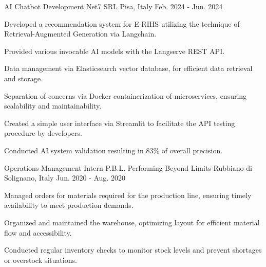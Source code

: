 

\begin{cventries}

  \cventry
  {AI Chatbot Development} %
  {Net7 SRL} %
  {Pisa, Italy} %
  {Feb. 2024 - Jun. 2024} %
  {
    \begin{cvitems} %
      \item {Developed a recommendation system for E-RIHS utilizing the technique of Retrieval-Augmented Generation via Langchain.}
      \item {Provided various invocable AI models with the Langserve REST API.}
      \item {Data management via Elasticsearch vector database, for efficient data retrieval and storage.}
      \item {Separation of concerns via Docker containerization of microservices, ensuring scalability and maintainability.}
      \item {Created a simple user interface via Streamlit to facilitate the API testing procedure by developers.}
      \item {Conducted AI system validation resulting in 83\% of overall precision.}
    \end{cvitems}
  }
  \cventry
  {Operations Management Intern} %
  {P.B.L. Performing Beyond Limits} %
  {Rubbiano di Solignano, Italy} %
  {Jun. 2020 - Aug. 2020} %
  {
    \begin{cvitems} %
      \item {Managed orders for materials required for the production line, ensuring timely availability to meet production demands.}
      \item {Organized and maintained the warehouse, optimizing layout for efficient material flow and accessibility.}
      \item {Conducted regular inventory checks to monitor stock levels and prevent shortages or overstock situations.}

\end{cvitems}}
\end{cventries}
